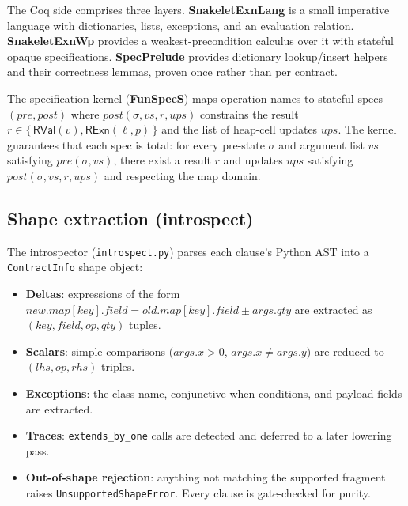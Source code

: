 \documentclass[11pt,a4paper]{article}
\begin{document}
The Coq side comprises three layers.  \textbf{SnakeletExnLang} is a
small imperative language with dictionaries, lists, exceptions, and an
evaluation relation.  \textbf{SnakeletExnWp} provides a
weakest-precondition calculus over it with stateful opaque
specifications.  \textbf{SpecPrelude} provides dictionary
lookup/insert helpers and their correctness lemmas, proven once rather
than per contract.

The specification kernel (\textbf{FunSpecS}) maps operation names to
stateful specs $(\mathit{pre}, \mathit{post})$ where
$\mathit{post}(\sigma, vs, r, \mathit{ups})$ constrains the result $r
\in \{\,\mathsf{RVal}(v), \mathsf{RExn}(\ell, p)\,\}$
and the list of heap-cell updates $\mathit{ups}$.  The kernel
guarantees that each spec is total: for every pre-state $\sigma$ and
argument list $vs$ satisfying $\mathit{pre}(\sigma, vs)$, there exist
a result $r$ and updates $\mathit{ups}$ satisfying
$\mathit{post}(\sigma, vs, r, \mathit{ups})$ and respecting the map
domain.

\subsection{Shape extraction (introspect)}

The introspector (\texttt{introspect.py}) parses each clause's Python
AST into a \texttt{ContractInfo} shape object:

\begin{itemize}[nosep]
\item \textbf{Deltas}: expressions of the form
  $\mathit{new}.\mathit{map}[\mathit{key}].\mathit{field}
  = \mathit{old}.\mathit{map}[\mathit{key}].\mathit{field} \pm
  \mathit{args}.\mathit{qty}$ are extracted as
  $(\mathit{key}, \mathit{field}, op, \mathit{qty})$ tuples.
\item \textbf{Scalars}: simple comparisons ($\mathit{args}.x > 0$,
  $\mathit{args}.x \neq \mathit{args}.y$) are reduced to
  $(\mathit{lhs}, op, \mathit{rhs})$ triples.
\item \textbf{Exceptions}: the class name, conjunctive when-conditions,
  and payload fields are extracted.
\item \textbf{Traces}: \texttt{extends\_by\_one} calls are detected
  and deferred to a later lowering pass.
\item \textbf{Out-of-shape rejection}: anything not matching the
  supported fragment raises \texttt{UnsupportedShapeError}.  Every
  clause is gate-checked for purity.
\end{itemize}
\end{document}
